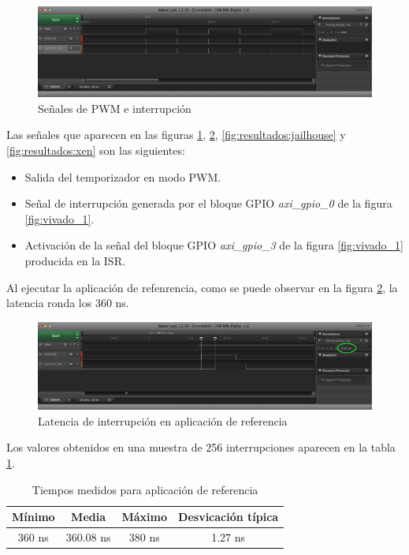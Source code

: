 \begin{figure}[h]
  \centering
  \includegraphics[width=1.0\textwidth]{recursos/baremetal_1.png}
  \caption{Señales de PWM e interrupción}
  \label{fig:resultados:baremetal_1}
\end{figure}

Las señales que aparecen en las figuras \ref{fig:resultados:baremetal_1}, \ref{fig:resultados:baremetal_2}, \ref{fig:resultados:jailhouse} y \ref{fig:resultados:xen} son las siguientes:
\begin{itemize}
  \item Salida del temporizador en modo \acrshort{PWM}.
  \item Señal de interrupción generada por el bloque \acrshort{GPIO} \textit{axi\_gpio\_0} de la figura \ref{fig:vivado_1}.
  \item Activación de la señal del bloque \acrshort{GPIO} \textit{axi\_gpio\_3} de la figura \ref{fig:vivado_1} producida en la \acrshort{ISR}.
\end{itemize}

Al ejecutar la aplicación de refenrencia, como se puede observar en la figura \ref{fig:resultados:baremetal_2}, la latencia ronda los 360 ns.\\

\begin{figure}[!h]
  \centering
  \includegraphics[width=1.0\textwidth]{recursos/baremetal_2.png}
  \caption{Latencia de interrupción en aplicación de referencia}
  \label{fig:resultados:baremetal_2}
\end{figure}

Los valores obtenidos en una muestra de 256 interrupciones aparecen en la tabla \ref{table:results_baremetal}. \\
\begin{table}[!ht]
  \centering
	\begin{tabular}{ |c|c|c|c| }
		\hline
    Mínimo          & Media      & Máximo  & Desvicación típica  \\
    \hline
    360 ns         & 360.08 ns      & 380 ns    & 1.27 ns	   \\
    \hline
	\end{tabular}
	\caption{Tiempos medidos para aplicación de referencia}
  \label{table:results_baremetal}
\end{table}

